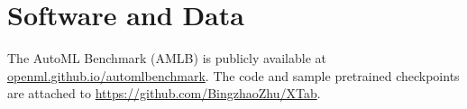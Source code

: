 \section*{Software and Data} The AutoML Benchmark (AMLB) is publicly available at \url{openml.github.io/automlbenchmark}. The code and sample pretrained checkpoints are attached to \url{https://github.com/BingzhaoZhu/XTab}.


